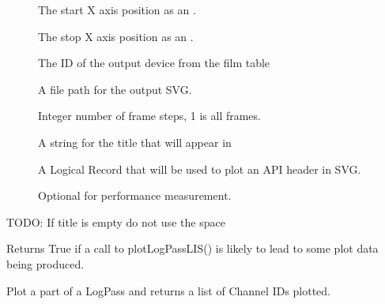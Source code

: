\documentclass[letterpaper,10pt,english]{sphinxmanual}
\begin{document}
\begin{fulllineitems}
\begin{fulllineitems}
\begin{description}
\item[{}] \leavevmode
The start X axis position as an .

\item[{}] \leavevmode
The stop X axis position as an .

\item[{}] \leavevmode
The ID of the output device from the film table

\item[{}] \leavevmode
A file path for the output SVG.

\item[{}] \leavevmode
Integer number of frame steps, 1 is all frames.

\item[{}] \leavevmode
A string for the title that will appear in 

\item[{}] \leavevmode
A  Logical Record that will be used to plot an API header in SVG.

\item[{}] \leavevmode
Optional  for performance measurement.

\end{description}

TODO: If title is empty do not use the space 

\end{fulllineitems}


\begin{fulllineitems}
\label{\detokenize{ref/util/plot/Plot:TotalDepth.util.plot.Plot.Plot.hasDataToPlotLAS}}
Returns True if a call to plotLogPassLIS() is likely to lead to some
plot data being produced.

\end{fulllineitems}


\begin{fulllineitems}
\label{\detokenize{ref/util/plot/Plot:TotalDepth.util.plot.Plot.Plot.plotLogPassLAS}}
Plot a part of a LogPass and returns a list of Channel IDs plotted.


\end{fulllineitems}
\end{fulllineitems}
\end{document}
